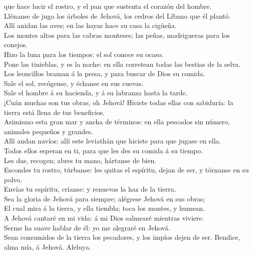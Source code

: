 que hace lucir el rostro, y el pan que sustenta el corazón del hombre.\\
 Llénanse de jugo los árboles de Jehová, los cedros del
Líbano que él plantó.\\
 Allí anidan las aves; en las hayas hace su casa la
cigüeña.\\
 Los montes altos para las cabras monteses; las peñas,
madrigueras para los conejos.\\
 Hizo la luna para los tiempos: el sol conoce su ocaso.\\
 Pone las tinieblas, y es la noche: en ella corretean
todas las bestias de la selva.\\
 Los leoncillos braman á la presa, y para buscar de Dios
su comida.\\
 Sale el sol, recógense, y échanse en sus cuevas.\\
 Sale el hombre á su hacienda, y á su labranza hasta la
tarde.\\
 ¡Cuán muchas son tus obras, oh Jehová! Hiciste todas
ellas con sabiduría: la tierra está llena de tus beneficios.\\
 Asimismo esta gran mar y ancha de términos: en ella
pescados sin número, animales pequeños y grandes.\\
 Allí andan navíos; allí este leviathán que hiciste para
que jugase en ella.\\
 Todos ellos esperan en ti, para que les des su comida á
su tiempo.\\
 Les das, recogen; abres tu mano, hártanse de bien.\\
 Escondes tu rostro, túrbanse: les quitas el espíritu,
dejan de ser, y tórnanse en su polvo.\\
 Envías tu espíritu, críanse: y renuevas la haz de la
tierra.\\
 Sea la gloria de Jehová para siempre; alégrese Jehová en
sus obras;\\
 El cual mira á la tierra, y ella tiembla; toca los
montes, y humean.\\
 A Jehová cantaré en mi vida: á mi Dios salmearé mientras
viviere.\\
 Serme ha suave hablar de él: yo me alegraré en Jehová.\\
 Sean consumidos de la tierra los pecadores, y los impíos
dejen de ser. Bendice, alma mía, á Jehová. Aleluya.

